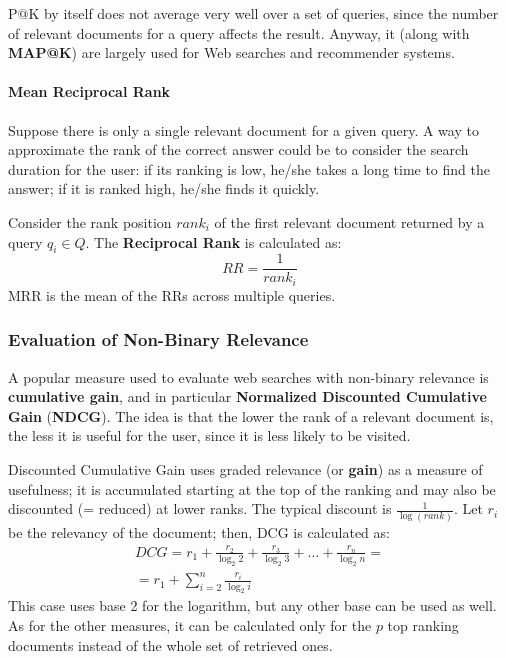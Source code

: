 P@K by itself does not average very well over a set of queries, since the number of relevant documents for a query affects the result. Anyway, it (along with \textbf{MAP@K}) are largely used for Web searches and recommender systems.

\paragraph{Mean Reciprocal Rank}

Suppose there is only a single relevant document for a given query. A way to approximate the rank of the correct answer could be to consider the search duration for the user: if its ranking is low, he/she takes a long time to find the answer; if it is ranked high, he/she finds it quickly.

Consider the rank position $\textit{rank}_i$ of the first relevant document returned by a query $q_i \in Q$. The \textbf{Reciprocal Rank} is calculated as:
\begin{equation*}
    \textit{RR} = \frac{1}{\textit{rank}_i}
\end{equation*}
MRR is the mean of the RRs across multiple queries.

\subsubsection{Evaluation of Non-Binary Relevance}

A popular measure used to evaluate web searches with non-binary relevance is \textbf{cumulative gain}, and in particular \textbf{Normalized Discounted Cumulative Gain} (\textbf{NDCG}). The idea is that the lower the rank of a relevant document is, the less it is useful for the user, since it is less likely to be visited.

Discounted Cumulative Gain uses graded relevance (or \textbf{gain}) as a measure of usefulness; it is accumulated starting at the top of the ranking and may also be discounted (= reduced) at lower ranks. The typical discount is $\frac{1}{\log(\textit{rank})}$. Let $r_i$ be the relevancy of the document; then, DCG is calculated as:
\begin{gather*}
    \textit{DCG} = r_1 + \frac{r_2}{\log_2 2} + \frac{r_3}{\log_2 3} + \dots + \frac{r_n}{\log_2 n} = \\
    = r_1 + \sum_{i=2}^n \frac{r_i}{\log_2 i}
\end{gather*}
This case uses base 2 for the logarithm, but any other base can be used as well. As for the other measures, it can be calculated only for the $p$ top ranking documents instead of the whole set of retrieved ones.

